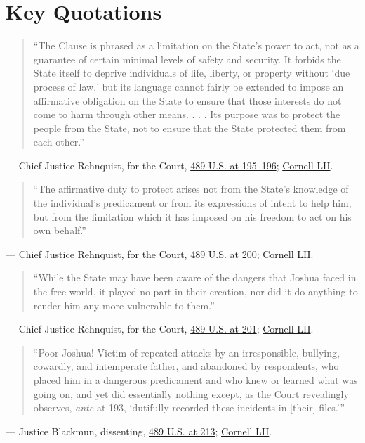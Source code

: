 \documentclass[12pt]{article}
\begin{document}
\section{Key Quotations}
\begin{quote}
``The Clause is phrased as a limitation on the State's power to act, not as a guarantee of certain minimal levels of safety and security. It forbids the State itself to deprive individuals of life, liberty, or property without `due process of law,' but its language cannot fairly be extended to impose an affirmative obligation on the State to ensure that those interests do not come to harm through other means. . . . Its purpose was to protect the people from the State, not to ensure that the State protected them from each other.''
\end{quote}
\noindent --- Chief Justice Rehnquist, for the Court, \href{https://supreme.justia.com/cases/federal/us/489/189/}{489 U.S. at 195--196}; \href{https://www.law.cornell.edu/supremecourt/text/489/189}{Cornell LII}.

\begin{quote}
``The affirmative duty to protect arises not from the State's knowledge of the individual's predicament or from its expressions of intent to help him, but from the limitation which it has imposed on his freedom to act on his own behalf.''
\end{quote}
\noindent --- Chief Justice Rehnquist, for the Court, \href{https://supreme.justia.com/cases/federal/us/489/189/}{489 U.S. at 200}; \href{https://www.law.cornell.edu/supremecourt/text/489/189}{Cornell LII}.

\begin{quote}
``While the State may have been aware of the dangers that Joshua faced in the free world, it played no part in their creation, nor did it do anything to render him any more vulnerable to them.''
\end{quote}
\noindent --- Chief Justice Rehnquist, for the Court, \href{https://supreme.justia.com/cases/federal/us/489/189/}{489 U.S. at 201}; \href{https://www.law.cornell.edu/supremecourt/text/489/189}{Cornell LII}.

\begin{quote}
``Poor Joshua! Victim of repeated attacks by an irresponsible, bullying, cowardly, and intemperate father, and abandoned by respondents, who placed him in a dangerous predicament and who knew or learned what was going on, and yet did essentially nothing except, as the Court revealingly observes, \textit{ante} at 193, `dutifully recorded these incidents in [their] files.'''
\end{quote}
\noindent --- Justice Blackmun, dissenting, \href{https://supreme.justia.com/cases/federal/us/489/189/}{489 U.S. at 213}; \href{https://www.law.cornell.edu/supremecourt/text/489/189}{Cornell LII}.
\end{document}
